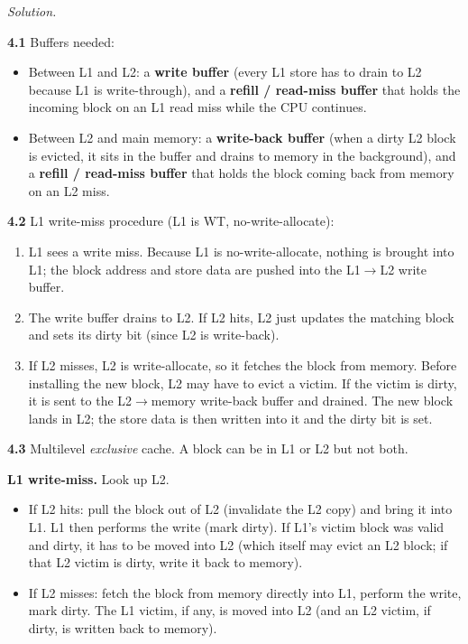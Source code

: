 \documentclass[12pt]{article}
\newenvironment{solution}{\par\noindent\textit{Solution.}\ }{\par\vspace{1.1em}}
\newcommand{\subproblem}[1]{\par\vspace{0.45em}\noindent\textbf{#1}\quad}
\begin{document}
\begin{solution}
\subproblem{4.1} Buffers needed:
\begin{itemize}\itemsep0pt
    \item Between L1 and L2: a \textbf{write buffer} (every L1 store has to drain to L2 because L1 is write-through), and a \textbf{refill / read-miss buffer} that holds the incoming block on an L1 read miss while the CPU continues.
    \item Between L2 and main memory: a \textbf{write-back buffer} (when a dirty L2 block is evicted, it sits in the buffer and drains to memory in the background), and a \textbf{refill / read-miss buffer} that holds the block coming back from memory on an L2 miss.
\end{itemize}

\subproblem{4.2} L1 write-miss procedure (L1 is WT, no-write-allocate):
\begin{enumerate}\itemsep0pt
    \item L1 sees a write miss. Because L1 is no-write-allocate, nothing is brought into L1; the block address and store data are pushed into the L1$\to$L2 write buffer.
    \item The write buffer drains to L2. If L2 hits, L2 just updates the matching block and sets its dirty bit (since L2 is write-back).
    \item If L2 misses, L2 is write-allocate, so it fetches the block from memory. Before installing the new block, L2 may have to evict a victim. If the victim is dirty, it is sent to the L2$\to$memory write-back buffer and drained. The new block lands in L2; the store data is then written into it and the dirty bit is set.
\end{enumerate}

\subproblem{4.3} Multilevel \emph{exclusive} cache. A block can be in L1 or L2 but not both.

\textbf{L1 write-miss.} Look up L2.
\begin{itemize}\itemsep0pt
    \item If L2 hits: pull the block out of L2 (invalidate the L2 copy) and bring it into L1. L1 then performs the write (mark dirty). If L1's victim block was valid and dirty, it has to be moved into L2 (which itself may evict an L2 block; if that L2 victim is dirty, write it back to memory).
    \item If L2 misses: fetch the block from memory directly into L1, perform the write, mark dirty. The L1 victim, if any, is moved into L2 (and an L2 victim, if dirty, is written back to memory).
\end{itemize}


\end{solution}
\end{document}
